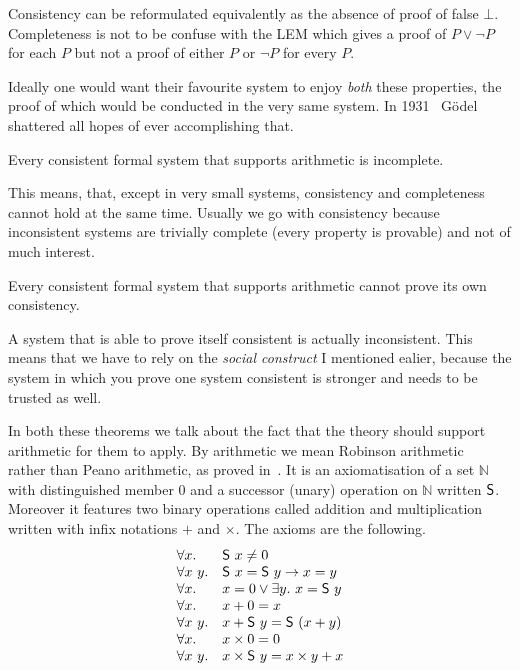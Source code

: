 Consistency can be reformulated equivalently as the absence of proof of false
\(\bot\).
Completeness is not to be confuse with the \acrshort{LEM} which gives a proof
of \(P \vee \neg P\) for each \(P\) but not a proof of either \(P\) or
\(\neg P\) for every \(P\).

Ideally one would want their favourite system to enjoy \emph{both} these
properties, the proof of which would be conducted in the very same system.
In 1931~ Gödel shattered all hopes of ever
accomplishing that.

\begin{theorem}
  Every consistent formal system that supports arithmetic is incomplete.
\end{theorem}

This means, that, except in very small systems, consistency and completeness
cannot hold at the same time. Usually we go with consistency because
inconsistent systems are trivially complete (every property is provable) and not
of much interest.

\begin{theorem}
  Every consistent formal system that supports arithmetic cannot prove its
  own consistency.
\end{theorem}
A system that is able to prove itself consistent is actually inconsistent.
This means that we have to rely on the \emph{social construct} I mentioned
ealier, because the system in which you prove one system consistent is stronger
and needs to be trusted as well.

In both these theorems we talk about the fact that the theory should support
arithmetic for them to apply. By arithmetic we mean Robinson
arithmetic~ rather than Peano arithmetic,
as proved in~.
It is an axiomatisation of a set \(\mathbb{N}\) with distinguished member
\(0\) and a successor (unary) operation on \(\mathbb{N}\) written \(\mathsf{S}\).
Moreover it features two binary operations called addition and multiplication
written with infix notations \(+\) and \(\times\).
The axioms are the following.
\[
  \begin{array}{ll}
    \forall x.& \mathsf{S}\ x \not= 0 \\
    \forall x\ y.& \mathsf{S}\ x = \mathsf{S}\ y \to x = y \\
    \forall x.& x = 0 \vee \exists y.\ x = \mathsf{S}\ y \\
    \forall x.& x + 0 = x \\
    \forall x\ y.& x + \mathsf{S}\ y = \mathsf{S}\ (x + y) \\
    \forall x.& x \times 0 = 0 \\
    \forall x\ y.& x \times \mathsf{S}\ y = x \times y + x
  \end{array}
\]

